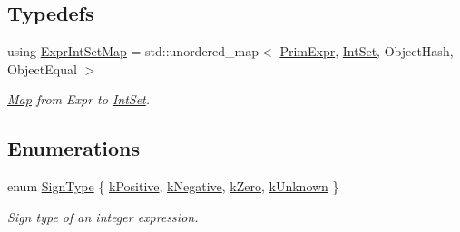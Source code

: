 \subsection*{Typedefs}
\begin{DoxyCompactItemize}
\item 
using \hyperlink{namespacetvm_1_1arith_a94daf21fa21c1f7dd83081248f26d9eb}{Expr\+Int\+Set\+Map} = std\+::unordered\+\_\+map$<$ \hyperlink{classtvm_1_1PrimExpr}{Prim\+Expr}, \hyperlink{classtvm_1_1arith_1_1IntSet}{Int\+Set}, Object\+Hash, Object\+Equal $>$
\begin{DoxyCompactList}\small\item\em \hyperlink{classtvm_1_1Map}{Map} from Expr to \hyperlink{classtvm_1_1arith_1_1IntSet}{Int\+Set}. \end{DoxyCompactList}\end{DoxyCompactItemize}
\subsection*{Enumerations}
\begin{DoxyCompactItemize}
\item 
enum \hyperlink{namespacetvm_1_1arith_aca8806e355ad3dd5f1df9c1eca9aac9d}{Sign\+Type} \{ \hyperlink{namespacetvm_1_1arith_aca8806e355ad3dd5f1df9c1eca9aac9da5eb70f55e8952b4484fe6c652138ae00}{k\+Positive}, 
\hyperlink{namespacetvm_1_1arith_aca8806e355ad3dd5f1df9c1eca9aac9da56331fd0b2625f7ce83b369b8a0a6f2a}{k\+Negative}, 
\hyperlink{namespacetvm_1_1arith_aca8806e355ad3dd5f1df9c1eca9aac9dab2f22d68a809adead1caf5ec7c61bf67}{k\+Zero}, 
\hyperlink{namespacetvm_1_1arith_aca8806e355ad3dd5f1df9c1eca9aac9da8812c1a077255594d23bc1c2f3af3979}{k\+Unknown}
 \}\begin{DoxyCompactList}\small\item\em Sign type of an integer expression. \end{DoxyCompactList}
\end{DoxyCompactItemize}
